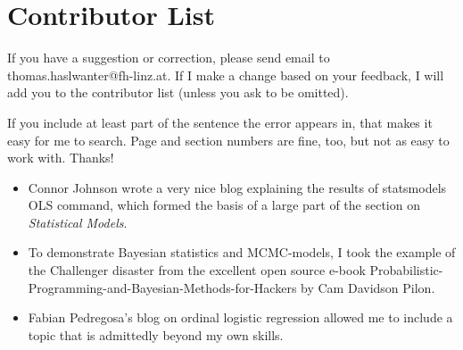\section*{Contributor List}

If you have a suggestion or correction, please send email to
thomas.haslwanter@fh-linz.at. If I make a change based on your feedback,
I will add you to the contributor list (unless you ask to be omitted).

If you include at least part of the sentence the error appears in, that
makes it easy for me to search. Page and section numbers are fine, too,
but not as easy to work with. Thanks!

\begin{itemize}
  \item Connor Johnson wrote a very nice blog explaining the results of
  statsmodels OLS command, which formed the basis of a large part of the
  section on \emph{Statistical Models}.

  \item To demonstrate Bayesian statistics and MCMC-models, I took the example of the Challenger disaster from the excellent open source e-book Probabilistic-Programming-and-Bayesian-Methods-for-Hackers by Cam Davidson Pilon.

  \item Fabian Pedregosa's blog on ordinal logistic regression allowed me to include a topic that is admittedly beyond my own skills.
\end{itemize}

